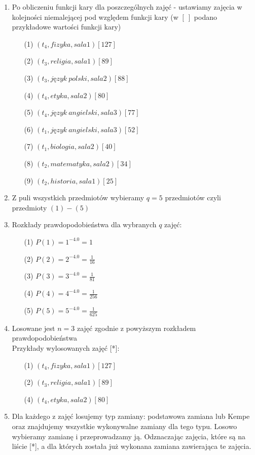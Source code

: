 \begin{enumerate}
\item Po obliczeniu funkcji kary dla poszczególnych zajęć - ustawiamy zajęcia w kolejności niemalejącej pod względem funkcji kary (w $[\ ]$ podano przykładowe wartości funkcji kary)\\
\begin{enumerate}
 \item[(1)] $(t_{4}, fizyka, sala1)[127]$
 \item[(2)] $(t_{3}, religia, sala1)[89]$
 \item[(3)] $(t_{3}, język\ polski, sala2)[88]$
 \item[(4)] $(t_{4}, etyka, sala2)[80]$
 \item[(5)] $(t_{4}, język\ angielski, sala3)[77]$
 \item[(6)] $(t_{1}, język\ angielski, sala3)[52]$
 \item[(7)] $(t_{1}, biologia, sala2)[40]$
 \item[(8)] $(t_{2}, matematyka, sala2)[34]$
 \item[(9)] $(t_{2}, historia, sala1)[25]$
\end{enumerate}
\item Z puli wszystkich przedmiotów wybieramy $q = 5$ przedmiotów czyli przedmioty $(1) - (5)$ 
\item Rozkłady prawdopodobieństwa dla wybranych $q$ zajęć:
	\begin{enumerate}
	\item[(1)] $P(1) = 1^{-4.0} = 1$
 	\item[(2)] $P(2) = 2^{-4.0} = \frac{1}{16}$
 	\item[(3)] $P(3) = 3^{-4.0} = \frac{1}{81}$
 	\item[(4)] $P(4) = 4^{-4.0} = \frac{1}{256}$
 	\item[(5)] $P(5) = 5^{-4.0} = \frac{1}{625}$
	\end{enumerate}
\item Losowane jest $n = 3$ zajęć zgodnie z powyższym rozkładem prawdopodobieństwa \\
	Przykłady wylosowanych zajęć [*]:
	\begin{enumerate}
	 \item[(1)] $(t_{4}, fizyka, sala1)[127]$
	 \item[(2)] $(t_{3}, religia, sala1)[89]$
	  \item[(4)] $(t_{4}, etyka, sala2)[80]$
	\end{enumerate}
\item Dla każdego z zajęć losujemy typ zamiany: podstawowa zamiana lub Kempe oraz znajdujemy wszystkie wykonywalne zamiany dla tego typu. Losowo wybieramy zamianę i przeprowadzamy ją. Odznaczając zajęcia, które są na liście [*], a dla których została już wykonana zamiana zawierająca te zajęcia.
\end{enumerate}

